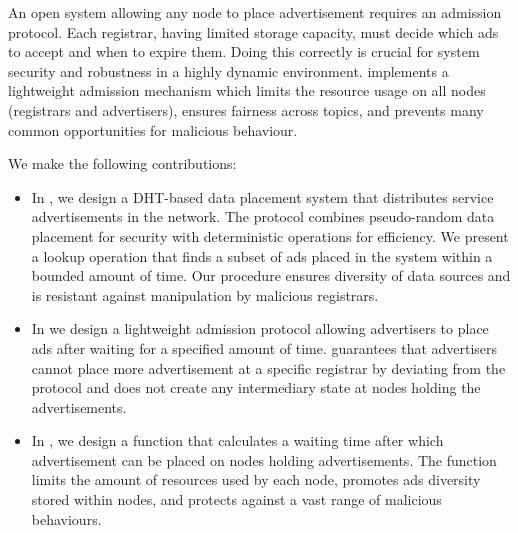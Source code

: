  

An open system allowing any node to place advertisement requires an admission protocol.  Each registrar, having limited storage capacity, must decide which ads to accept and when to expire them. Doing this correctly is crucial for system security and robustness in a highly dynamic environment. \sysname implements a lightweight admission mechanism which limits the resource usage on all nodes (registrars and advertisers), ensures fairness across topics, and prevents many common opportunities for malicious behaviour.

 We make the following contributions:
\begin{itemize}
    \item In , we design a DHT-based data placement system that distributes service advertisements in the network. The protocol combines pseudo-random data placement for security  with deterministic operations for efficiency. We present a lookup operation that finds a subset of ads placed in the system within a bounded amount of time. Our procedure ensures diversity of data sources and is resistant against manipulation by malicious registrars. 
    \item In  we design a lightweight admission protocol allowing advertisers to place ads after waiting for a specified amount of time. %
    \sysname guarantees that advertisers cannot place more advertisement at a specific registrar by deviating from the protocol %
    and does not create any intermediary state at nodes holding the advertisements.
    
    \item In , we design a function that calculates a waiting time after which advertisement can be placed on nodes holding advertisements. The function limits the amount of resources used by each node, promotes ads diversity stored within nodes, and protects against a vast range of malicious behaviours. 
\end{itemize}

